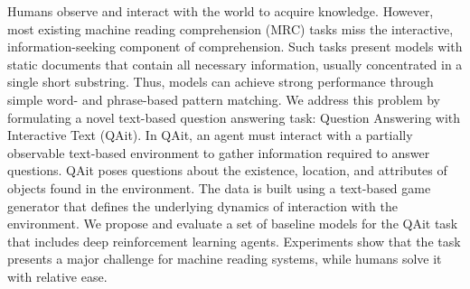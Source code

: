 Humans observe and interact with the world to acquire knowledge.
However, most existing machine reading comprehension (MRC) tasks miss the interactive, information-seeking component of comprehension. Such tasks present models with static documents that contain all necessary information, usually concentrated in a single short substring. Thus, models can achieve strong performance through simple word- and phrase-based pattern matching.
We address this problem by formulating a novel text-based question answering task: Question Answering with Interactive Text (QAit).
In QAit, an agent must interact with a partially observable text-based environment to gather information required to answer questions.
QAit poses questions about the existence, location, and attributes of objects found in the environment.
The data is built using a text-based game generator that defines the underlying dynamics of interaction with the environment.
We propose and evaluate a set of baseline models for the QAit task that includes deep reinforcement learning agents.
Experiments show that the task presents a major challenge for machine reading systems, while humans solve it with relative ease.